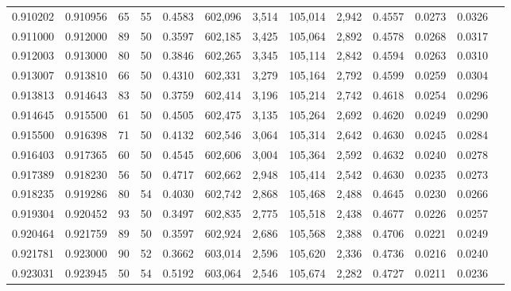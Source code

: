 \begin{tabular}{rrrrrrrrrrrrr}
0.910202 & 0.910956 &    65 &  55 &                                     0.4583 & 602,096 &   3,514 & 105,014 &   2,942 & 0.4557 & 0.0273 & 0.0326 \\
0.911000 & 0.912000 &    89 &  50 &                                     0.3597 & 602,185 &   3,425 & 105,064 &   2,892 & 0.4578 & 0.0268 & 0.0317 \\
0.912003 & 0.913000 &    80 &  50 &                                     0.3846 & 602,265 &   3,345 & 105,114 &   2,842 & 0.4594 & 0.0263 & 0.0310 \\
0.913007 & 0.913810 &    66 &  50 &                                     0.4310 & 602,331 &   3,279 & 105,164 &   2,792 & 0.4599 & 0.0259 & 0.0304 \\
0.913813 & 0.914643 &    83 &  50 &                                     0.3759 & 602,414 &   3,196 & 105,214 &   2,742 & 0.4618 & 0.0254 & 0.0296 \\
0.914645 & 0.915500 &    61 &  50 &                                     0.4505 & 602,475 &   3,135 & 105,264 &   2,692 & 0.4620 & 0.0249 & 0.0290 \\
0.915500 & 0.916398 &    71 &  50 &                                     0.4132 & 602,546 &   3,064 & 105,314 &   2,642 & 0.4630 & 0.0245 & 0.0284 \\
0.916403 & 0.917365 &    60 &  50 &                                     0.4545 & 602,606 &   3,004 & 105,364 &   2,592 & 0.4632 & 0.0240 & 0.0278 \\
0.917389 & 0.918230 &    56 &  50 &                                     0.4717 & 602,662 &   2,948 & 105,414 &   2,542 & 0.4630 & 0.0235 & 0.0273 \\
0.918235 & 0.919286 &    80 &  54 &                                     0.4030 & 602,742 &   2,868 & 105,468 &   2,488 & 0.4645 & 0.0230 & 0.0266 \\
0.919304 & 0.920452 &    93 &  50 &                                     0.3497 & 602,835 &   2,775 & 105,518 &   2,438 & 0.4677 & 0.0226 & 0.0257 \\
0.920464 & 0.921759 &    89 &  50 &                                     0.3597 & 602,924 &   2,686 & 105,568 &   2,388 & 0.4706 & 0.0221 & 0.0249 \\
0.921781 & 0.923000 &    90 &  52 &                                     0.3662 & 603,014 &   2,596 & 105,620 &   2,336 & 0.4736 & 0.0216 & 0.0240 \\
0.923031 & 0.923945 &    50 &  54 &                                     0.5192 & 603,064 &   2,546 & 105,674 &   2,282 & 0.4727 & 0.0211 & 0.0236 \\

\end{tabular}
